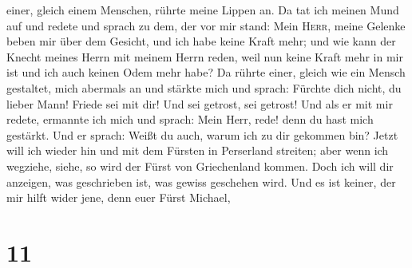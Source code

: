 einer, gleich einem Menschen, rührte meine Lippen an. Da tat ich meinen
Mund auf und redete und sprach zu dem, der vor mir stand: Mein
\textsc{Herr}, meine Gelenke beben mir über dem Gesicht, und ich habe
keine Kraft mehr;  und wie kann der Knecht meines Herrn
mit meinem Herrn reden, weil nun keine Kraft mehr in mir ist und ich
auch keinen Odem mehr habe?  Da rührte einer, gleich wie
ein Mensch gestaltet, mich abermals an und stärkte mich 
und sprach: Fürchte dich nicht, du lieber Mann! Friede sei mit dir! Und
sei getrost, sei getrost! Und als er mit mir redete, ermannte ich mich
und sprach: Mein Herr, rede! denn du hast mich gestärkt. 
Und er sprach: Weißt du auch, warum ich zu dir gekommen bin? Jetzt will
ich wieder hin und mit dem Fürsten in Perserland streiten; aber wenn ich
wegziehe, siehe, so wird der Fürst von Griechenland kommen.
 Doch ich will dir anzeigen, was geschrieben ist, was
gewiss geschehen wird. Und es ist keiner, der mir hilft wider jene, denn
euer Fürst Michael,

\hypertarget{section-10}{%
\section{11}\label{section-10}}

